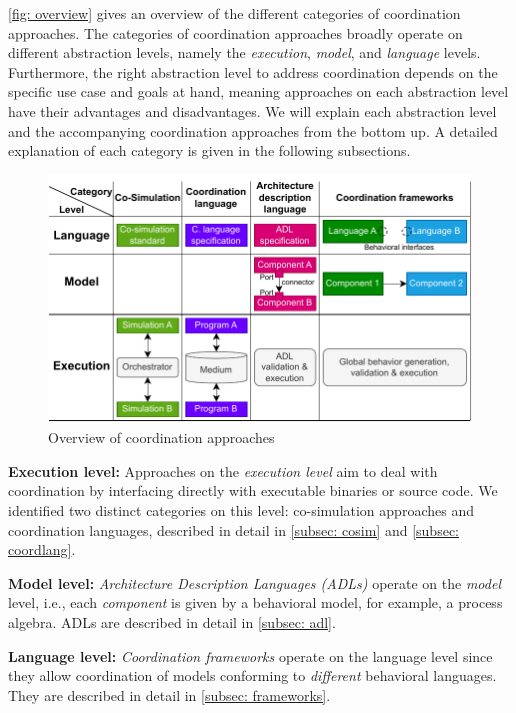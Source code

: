 \documentclass[runningheads]{llncs}
\begin{document}
\autoref{fig: overview} gives an overview of the different categories of coordination approaches.
The categories of coordination approaches broadly operate on different abstraction levels, namely the \textit{execution}, \textit{model}, and \textit{language} levels.
Furthermore, the right abstraction level to address coordination depends on the specific use case and goals at hand, meaning approaches on each abstraction level have their advantages and disadvantages.
We will explain each abstraction level and the accompanying coordination approaches from the bottom up.
A detailed explanation of each category is given in the following subsections.

\begin{figure}[ht]
	\centering
	\includegraphics[width=1\textwidth]{images/overview}
	\caption{Overview of coordination approaches}
	\label{fig: overview}
\end{figure}

\textbf{Execution level:} Approaches on the \textit{execution level} aim to deal with coordination by interfacing directly with executable binaries or source code.
We identified two distinct categories on this level: co-simulation approaches and coordination languages, described in detail in \autoref{subsec: cosim} and \autoref{subsec: coordlang}.

\textbf{Model level:}
\textit{Architecture Description Languages (ADLs)} operate on the \textit{model} level, i.e., each \textit{component} is given by a behavioral model, for example, a process algebra.
ADLs are described in detail in \autoref{subsec: adl}.

\textbf{Language level:}
\textit{Coordination frameworks} operate on the language level since they allow coordination of models conforming to \textit{different} behavioral languages.
They are described in detail in \autoref{subsec: frameworks}.
\end{document}
